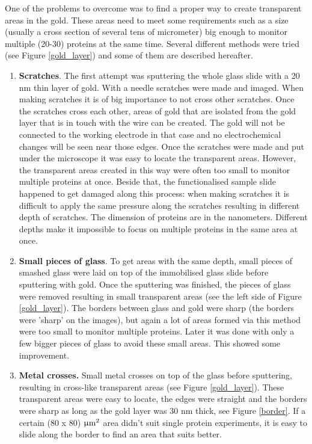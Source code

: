 \documentclass[twoside,single]{lion-msc}
\begin{document}
One of the problems to overcome was to find a proper way to create transparent areas in the gold. These areas need to meet some requirements such as a size (usually a cross section of several tens of micrometer) big enough to monitor multiple (20-30) proteins at the same time.
Several different methods were tried (see Figure \ref{gold_layer}) and some of them are described hereafter.
\begin{enumerate}
\item \textbf{Scratches}.  The first attempt was sputtering the whole glass slide with a 20 nm thin layer of gold. With a needle scratches were made and imaged. When making scratches it is of big importance to not cross other scratches. Once the scratches cross each other, areas of gold that are isolated from the gold layer that is in touch with the wire can be created. The gold will not be connected to the working electrode in that case and no electrochemical changes will be seen near those edges. Once the scratches were made and put under the microscope it was easy to locate the transparent areas. However, the transparent areas created in this way were often too small to monitor multiple proteins at once. Beside that, the functionalised sample slide happened to get damaged along this process: when making scratches it is difficult to apply the same pressure along the scratches resulting in different depth of scratches. The dimension of proteins are in the nanometers. Different depths make it impossible to focus on multiple proteins in the same area at once.
\item \textbf{Small pieces of glass}. To get areas with the same depth, small pieces of smashed glass were laid on top of the immobilised glass slide before sputtering with gold. Once the sputtering was finished, the pieces of glass were removed resulting in small transparent areas (see the left side of Figure \ref{gold_layer}). The borders between glass and gold were sharp (the borders were 'sharp' on the images), but again a lot of areas formed via this method were too small to monitor multiple proteins. Later it was done with only a few bigger pieces of glass to avoid these small areas. This showed some improvement. 
\item \textbf{Metal crosses.} Small metal crosses on top of the glass before sputtering, resulting in cross-like transparent areas (see Figure \ref{gold_layer}). These transparent areas were easy to locate, the edges were straight and the borders were sharp as long as the gold layer was 30 nm thick, see Figure \ref{border}. If a certain (80 x 80) $\upmu \textup{m}^{2}$ area didn't suit single protein experiments, it is easy to slide along the border to find an area that suits better. 
\end{enumerate}
\end{document}
